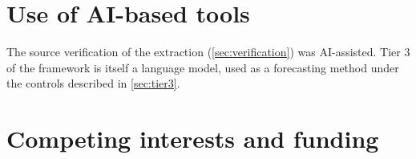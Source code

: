 \section*{Use of AI-based tools}

The source verification of the extraction (\cref{sec:verification}) was AI-assisted. Tier 3 of the framework is
itself a language model, used as a forecasting method under the controls described in \cref{sec:tier3}.

\section*{Competing interests and funding}

